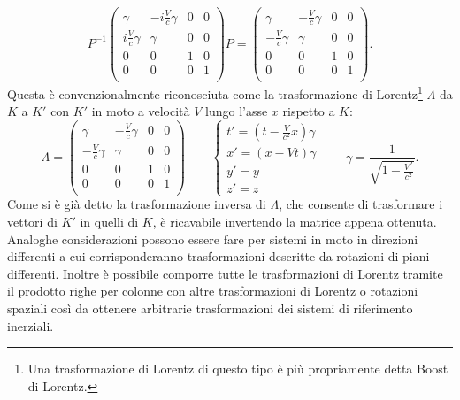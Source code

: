  \begin{equation*}
    P^{-1}\begin{pmatrix}
        \gamma & -i\frac{V}{c}\gamma & 0 & 0\\
        i\frac{V}{c}\gamma & \gamma & 0 & 0\\
        0& 0 & 1 & 0\\
        0& 0 & 0 & 1\\
       \end{pmatrix}
       P=\begin{pmatrix}
        \gamma & -\frac{V}{c}\gamma & 0 & 0\\
        -\frac{V}{c}\gamma & \gamma & 0 & 0\\
        0& 0 & 1 & 0\\
        0& 0 & 0 & 1\\
       \end{pmatrix}.
 \end{equation*}
 Questa è convenzionalmente riconosciuta come la trasformazione di Lorentz\footnote{Una trasformazione di Lorentz di questo tipo è più propriamente detta Boost di Lorentz.} $\Lambda$ da $K$ a $K'$ con $K'$ in moto a velocità $V$ lungo l'asse $x$ rispetto a $K$:
 \begin{equation}
    \Lambda=
    \begin{pmatrix}
        \gamma & -\frac{V}{c}\gamma & 0 & 0\\
        -\frac{V}{c}\gamma & \gamma & 0 & 0\\
        0& 0 & 1 & 0\\
        0& 0 & 0 & 1\\
       \end{pmatrix}
       \qquad
       \begin{cases}
        t'=(t-\frac{V}{c^2}x)\gamma\\
        x'=(x-Vt)\gamma\\
        y'=y\\
        z'=z
       \end{cases}
       \qquad \gamma=\frac{1}{\sqrt{1-\frac{V^2}{c^2}}}.
       \label{TrasformazioneLorentz}
 \end{equation}
Come si è già detto la trasformazione inversa di $\Lambda$, che consente di trasformare i vettori di $K'$ in quelli di $K$, è ricavabile invertendo la matrice appena ottenuta.\\

Analoghe considerazioni possono essere fare per sistemi in moto in direzioni differenti a cui corrisponderanno trasformazioni descritte da rotazioni di piani differenti. Inoltre è possibile comporre tutte le trasformazioni di Lorentz tramite il prodotto righe per colonne con altre trasformazioni di Lorentz o rotazioni spaziali così da ottenere arbitrarie trasformazioni dei sistemi di riferimento inerziali.\\

